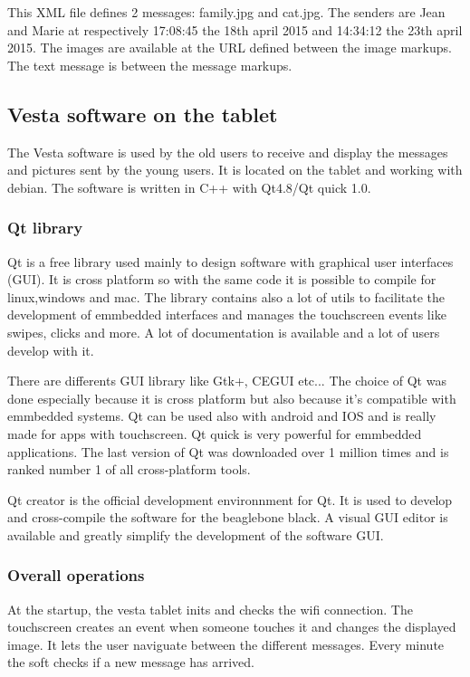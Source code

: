 This XML file defines 2 messages: family.jpg and cat.jpg. The senders are Jean and Marie at respectively 17:08:45 the 18th april 2015 and 14:34:12 the 23th april 2015. The images are available at the URL defined between the image markups. The text message is between the message markups.

\clearpage

\subsection{Vesta software on the tablet}
The Vesta software is used by the old users to receive and display the messages and pictures sent by the young users. It is located on the tablet and working with debian. The software is written in C++ with Qt4.8/Qt quick 1.0.

\subsubsection{Qt library}
Qt is a free library used mainly to design software with graphical user interfaces (GUI). It is cross platform so with the same code it is possible to compile for linux,windows and mac.
The library contains also a lot of utils to facilitate the development of emmbedded interfaces and manages the touchscreen events like swipes, clicks and more. A lot of documentation is available and a lot of users develop with it.

There are differents GUI library like Gtk+, CEGUI etc... The choice of Qt was done especially because it is cross platform but also because it's compatible with emmbedded systems. Qt can be used also with android and IOS and is really made for apps with touchscreen. Qt quick is very powerful for emmbedded applications. The last version of Qt was downloaded over 1 million times and is ranked number 1 of all cross-platform tools.

Qt creator is the official development environnment for Qt. It is used to develop and cross-compile the software for the beaglebone black. A visual GUI editor is available and greatly simplify the development of the software GUI.

\clearpage

\subsubsection{Overall operations}
At the startup, the vesta tablet inits and checks the wifi connection. The touchscreen creates an event when someone touches it and changes the displayed image. It lets the user naviguate between the different messages. Every minute the soft checks if a new message has arrived.

